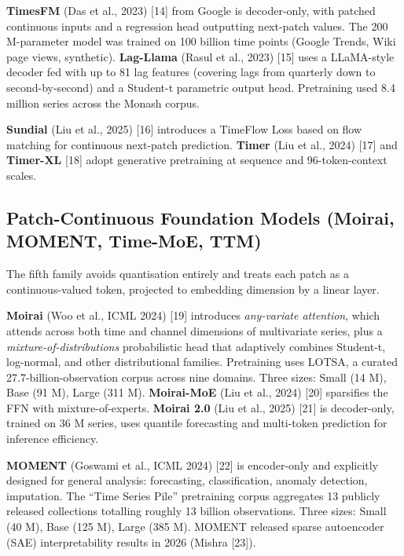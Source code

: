 \textbf{TimesFM} (Das et al., 2023) {[}14{]} from Google is decoder-only, with patched continuous inputs and a regression head outputting next-patch values. The 200 M-parameter model was trained on 100 billion time points (Google Trends, Wiki page views, synthetic). \textbf{Lag-Llama} (Rasul et al., 2023) {[}15{]} uses a LLaMA-style decoder fed with up to 81 lag features (covering lags from quarterly down to second-by-second) and a Student-t parametric output head. Pretraining used 8.4 million series across the Monash corpus.

\textbf{Sundial} (Liu et al., 2025) {[}16{]} introduces a TimeFlow Loss based on flow matching for continuous next-patch prediction. \textbf{Timer} (Liu et al., 2024) {[}17{]} and \textbf{Timer-XL} {[}18{]} adopt generative pretraining at sequence and 96-token-context scales.

\subsection{Patch-Continuous Foundation Models (Moirai, MOMENT, Time-MoE, TTM)}\label{patch-continuous-foundation-models-moirai-moment-time-moe-ttm}

The fifth family avoids quantisation entirely and treats each patch as a continuous-valued token, projected to embedding dimension by a linear layer.

\textbf{Moirai} (Woo et al., ICML 2024) {[}19{]} introduces \emph{any-variate attention}, which attends across both time and channel dimensions of multivariate series, plus a \emph{mixture-of-distributions} probabilistic head that adaptively combines Student-t, log-normal, and other distributional families. Pretraining uses LOTSA, a curated 27.7-billion-observation corpus across nine domains. Three sizes: Small (14 M), Base (91 M), Large (311 M). \textbf{Moirai-MoE} (Liu et al., 2024) {[}20{]} sparsifies the FFN with mixture-of-experts. \textbf{Moirai 2.0} (Liu et al., 2025) {[}21{]} is decoder-only, trained on 36 M series, uses quantile forecasting and multi-token prediction for inference efficiency.

\textbf{MOMENT} (Goswami et al., ICML 2024) {[}22{]} is encoder-only and explicitly designed for general analysis: forecasting, classification, anomaly detection, imputation. The ``Time Series Pile'' pretraining corpus aggregates 13 publicly released collections totalling roughly 13 billion observations. Three sizes: Small (40 M), Base (125 M), Large (385 M). MOMENT released sparse autoencoder (SAE) interpretability results in 2026 (Mishra {[}23{]}).

